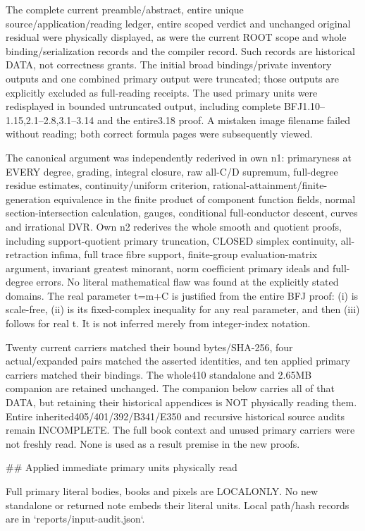 \documentclass[11pt]{article}
\begin{document}
The complete current preamble/abstract, entire unique source/application/reading ledger, entire scoped verdict and unchanged original residual were physically displayed, as were the current ROOT scope and whole binding/serialization records and the compiler record. Such records are historical DATA, not correctness grants. The initial broad bindings/private inventory outputs and one combined primary output were truncated; those outputs are explicitly excluded as full-reading receipts. The used primary units were redisplayed in bounded untruncated output, including complete BFJ1.10--1.15,2.1--2.8,3.1--3.14 and the entire3.18 proof. A mistaken image filename failed without reading; both correct formula pages were subsequently viewed.

The canonical argument was independently rederived in own n1: primaryness at EVERY degree, grading, integral closure, raw all-C/D supremum, full-degree residue estimates, continuity/uniform criterion, rational-attainment/finite-generation equivalence in the finite product of component function fields, normal section-intersection calculation, gauges, conditional full-conductor descent, curves and irrational DVR. Own n2 rederives the whole smooth and quotient proofs, including support-quotient primary truncation, CLOSED simplex continuity, all-retraction infima, full trace fibre support, finite-group evaluation-matrix argument, invariant greatest minorant, norm coefficient primary ideals and full-degree errors. No literal mathematical flaw was found at the explicitly stated domains. The real parameter t=m+C is justified from the entire BFJ proof: (i) is scale-free, (ii) is its fixed-complex inequality for any real parameter, and then (iii) follows for real t. It is not inferred merely from integer-index notation.

Twenty current carriers matched their bound bytes/SHA-256, four actual/expanded pairs matched the asserted identities, and ten applied primary carriers matched their bindings. The whole410 standalone and 2.65MB companion are retained unchanged. The companion below carries all of that DATA, but retaining their historical appendices is NOT physically reading them. Entire inherited405/401/392/B341/E350 and recursive historical source audits remain INCOMPLETE. The full book context and unused primary carriers were not freshly read. None is used as a result premise in the new proofs.

\#\# Applied immediate primary units physically read

Full primary literal bodies, books and pixels are LOCALONLY. No new standalone or returned note embeds their literal units. Local path/hash records are in `reports/input-audit.json`.
\end{document}
